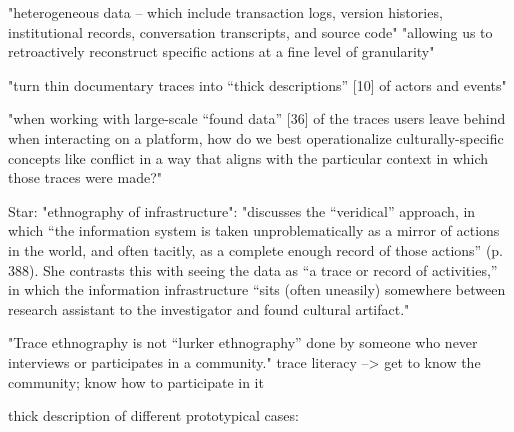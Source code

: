 "heterogeneous data – which include transaction logs,
version histories, institutional records, conversation
transcripts, and source code"
"allowing us to retroactively reconstruct specific actions
at a fine level of granularity"

"turn thin documentary traces into
“thick descriptions” [10] of actors and events"

\cite{GeiHal2017}
"when working with large-scale “found data” [36] of the traces
users leave behind when interacting on a platform, how do we best operationalize culturally-specific
concepts like conflict in a way that aligns with the particular context in which those traces were made?"

Star: "ethnography of infrastructure":
"discusses the “veridical” approach, in which “the information system
is taken unproblematically as a mirror of actions in the world, and often tacitly, as a complete
enough record of those actions” (p. 388).
She contrasts this with seeing the data as “a trace or record
of activities,” in which the information infrastructure “sits (often uneasily) somewhere between
research assistant to the investigator and found cultural artifact."

"Trace
ethnography is not “lurker ethnography” done by someone who never interviews or participates in
a community."
trace literacy --> get to know the community; know how to participate in it

thick description of different prototypical cases:

\begin{comment}
vgl \cite{GeiHal2017}
iterative mixed method
combination of:
* quantitative methods: mining big data sets/computational social science
"begin with one or
more large (but often thin) datasets generated by a software platform, which has recorded digital
traces that users leave in interacting on that platform. Such researchers then seek to mine as much
signal and significance from these found datasets as they can at scale in order to answer a research
question"
* more traditional social science/qualitative methods, e.g. interviews, observations, experiments
\end{comment}

